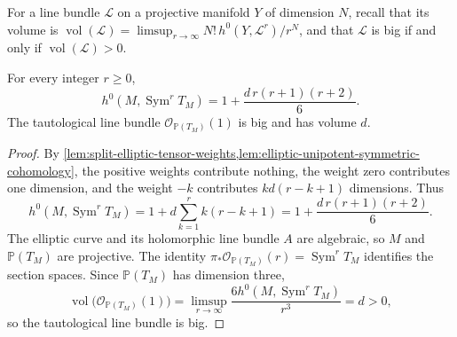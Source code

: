 For a line bundle $\mathcal L$ on a projective manifold $Y$ of dimension $N$, recall that its volume is $\operatorname{vol}(\mathcal L)=\limsup_{r\to\infty}N!\,h^0(Y,\mathcal L^r)/r^N$, and that $\mathcal L$ is big if and only if $\operatorname{vol}(\mathcal L)>0$.

\begin{theorem}\label{thm:split-elliptic-symmetric-dimensions}
For every integer $r\geq0$,
\[
 h^0(M,\operatorname{Sym}^rT_M)
       =1+\frac{d\,r(r+1)(r+2)}6.
\]
The tautological line bundle $\mathcal O_{\mathbb P(T_M)}(1)$ is big and has volume $d$.
\end{theorem}
\begin{proof}
By \cref{lem:split-elliptic-tensor-weights,lem:elliptic-unipotent-symmetric-cohomology}, the positive weights contribute nothing, the weight zero contributes one dimension, and the weight $-k$ contributes $kd(r-k+1)$ dimensions. Thus
\[
 h^0(M,\operatorname{Sym}^rT_M)
 =1+d\sum_{k=1}^r k(r-k+1)
 =1+\frac{d\,r(r+1)(r+2)}6.
\]
The elliptic curve and its holomorphic line bundle $A$ are algebraic, so $M$ and $\mathbb P(T_M)$ are projective. The identity $\pi_*\mathcal O_{\mathbb P(T_M)}(r)=\operatorname{Sym}^rT_M$ identifies the section spaces. Since $\mathbb P(T_M)$ has dimension three,
\[
 \operatorname{vol}\bigl(\mathcal O_{\mathbb P(T_M)}(1)\bigr)
 =\limsup_{r\to\infty}\frac{6h^0(M,\operatorname{Sym}^rT_M)}{r^3}=d>0,
\]
so the tautological line bundle is big.
\end{proof}

